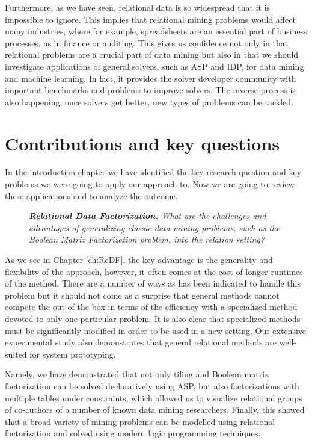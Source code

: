 Furthermore, as we have seen, relational data is so widespread that it is
impossible to ignore. This implies that relational mining problems
would affect many industries, where for example, spreadsheets are
an essential part of business processes, as in finance or auditing.
This gives us confidence not only in that relational problems are a
crucial part of data mining but also in that we should investigate
applications of general solvers, such as ASP and IDP, for data mining
and machine learning. In fact, it provides the solver developer community
with important benchmarks and problems to improve solvers. The inverse
process is also happening, once solvers get better, new types of problems
can be tackled.

\section{Contributions and key questions}
In the introduction chapter we have identified the key research
question and key problems we were going to apply our approach to. Now
we are going to review these applications and to analyze the outcome.

\begin{description}
\item[\cone] \textit{\textbf{Relational Data Factorization.} What are the challenges and advantages of generalizing classic data mining problems, such as the Boolean Matrix
    Factorization problem, into the relation setting?}
\end{description}

As we see in Chapter \ref{ch:ReDF}, the key advantage is the
generality and flexibility of the approach, however, it often comes at
the cost of longer runtimes of the method. There are a number of ways
as has been indicated to handle this problem but it should not come as
a surprise that general methods cannot compete the out-of-the-box in
terms of the efficiency with
a specialized method devoted to only one particular problem. It is
also clear that specialized methods must be significantly modified in
order to be used in a new setting. Our extensive experimental study
also demonstrates that general relational methods are well-suited for
system prototyping.

Namely, we have demonstrated that not only tiling and Boolean matrix
factorization can be solved declaratively using ASP, but also
factorizations with multiple tables under constraints, which allowed
us to visualize relational groups of co-authors of a
number of known data mining researchers. Finally, this showed that a
broad variety of mining problems can be modelled using relational
factorization and solved using modern logic programming
techniques.

